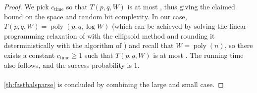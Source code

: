 \documentclass[epsfig,letter,11pt]{article}
\numberwithin{equation}{section}
\newcommand{\otil}{\tilde{O}}
\renewcommand{\tilde}{\widetilde}
\DeclareMathOperator*{\poly}{poly}
\begin{document}
\begin{proof}
We pick $c_{\text{time}}$ so that $T(p,q,W)$ is at most \smash{$\otil(n/b^2)\cdot \log^{O(\frac{\log n}{\log 1/b})}n$}, thus giving the claimed bound on the space and random bit complexity. In our case, $T(p,q,W)=\poly(p,q,\log W)$ (which can be achieved by solving the linear programming relaxation of \cite{leightonrao} with the ellipsoid method and rounding it deterministically with the algorithm of \cite{llr}) and recall that $W=\poly(n)$, so there exists a constant $c_{\text{time}} \ge 1$ such that $T(p,q,W)$ is at most . The running time also follows, and the success probability is $1$.
\\~\\
 \cref{th:fastbalsparse} is concluded by combining the large and small case.

\end{proof}
\end{document}
